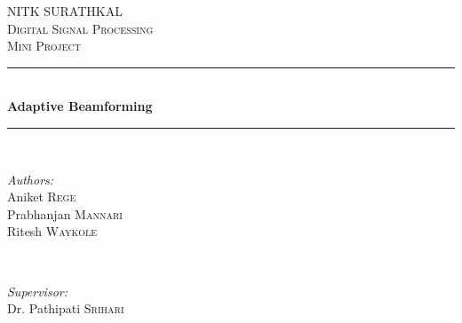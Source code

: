 \begin{titlepage}

\newcommand{\HRule}{\rule{\linewidth}{0.5mm}} %

\center %
 

\textsc{\LARGE NITK SURATHKAL}\\[1.5cm] %
\textsc{\Large Digital Signal Processing}\\[0.5cm] %
\textsc{\large Mini Project}\\[0.5cm] %


\HRule \\[0.4cm]
{ \huge \bfseries Adaptive Beamforming}\\[0.4cm] %
\HRule \\[0.5cm]
 

\begin{minipage}{0.4\textwidth}
\begin{flushleft} \large
\emph{Authors:}\\
Aniket \textsc{Rege}\\
Prabhanjan \textsc{Mannari}\\
Ritesh \textsc{Waykole}\\%
\end{flushleft}
\end{minipage}
~
\begin{minipage}{0.4\textwidth}
\begin{flushright} \large
\emph{Supervisor:} \\
Dr. Pathipati \textsc{Srihari} %
\end{flushright}
\end{minipage}\\[1cm]


\end{titlepage}
